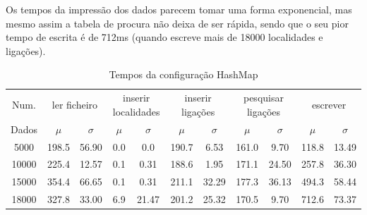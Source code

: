 \documentclass[a5paper,twocolumn, 11pt]{article}
\begin{document}
Os tempos da impressão dos dados parecem tomar uma forma exponencial, mas mesmo assim a tabela de procura não deixa de ser rápida, sendo que o seu pior tempo de escrita é de 712ms (quando escreve mais de 18000 localidades e ligações). 
\clearpage
\onecolumn
    \begin{table}[h!b!t!]
    \begin{center}
    \caption{Tempos da configuração HashMap}
\begin{tabular}{ | *{11}{c|} }
\hline
    Num. & \multicolumn{2}{|c|}{ler ficheiro} & \multicolumn{2}{|c|}{inserir localidades} & \multicolumn{2}{|c|}{inserir ligações} & \multicolumn{2}{|c|}{pesquisar ligações} & \multicolumn{2}{|c|}{escrever}\\ %
    
    Dados & $\mu$ & $\sigma$ & $\mu$ & $\sigma$ & $\mu$ & $\sigma$ & $\mu$ & $\sigma$ & $\mu$ & $\sigma$\\ \hline
    5000 & 198.5 & 56.90 & 0.0 & 0.0 & 190.7 & 6.53 & 161.0 & 9.70 & 118.8 & 13.49\\ \hline
    10000 & 225.4 & 12.57 & 0.1 & 0.31 & 188.6 & 1.95 & 171.1 & 24.50 & 257.8 & 36.30\\ \hline
    15000 & 354.4 & 66.65 & 0.1 & 0.31 & 211.1 & 32.29 & 177.3 & 36.13 & 494.3 & 58.44\\ \hline
    18000 & 327.8 & 33.00 & 6.9 & 21.47 & 201.2 & 25.32 & 170.5 & 9.70 & 712.6 & 73.37\\ \hline
\end{tabular}
\end{center}
\end{table}
\end{document}
